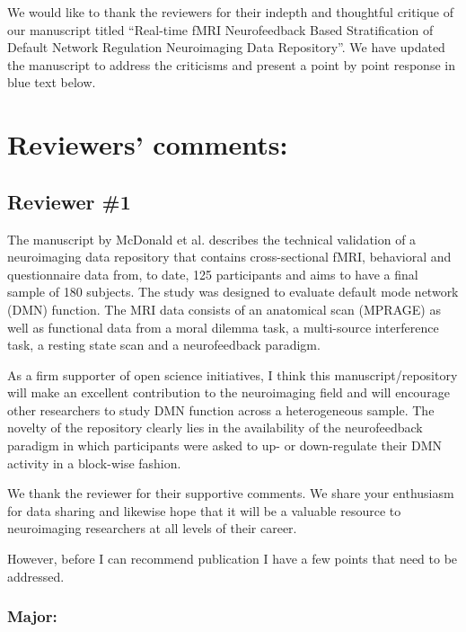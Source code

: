 \documentclass{article}
\newcommand{\RESPONSE}[1]{\textcolor{responseblue}{#1}}
\begin{document}
\sffamily

We would like to thank the reviewers for their indepth and thoughtful critique of our manuscript titled ``Real-time fMRI Neurofeedback Based Stratification of Default Network Regulation Neuroimaging Data Repository''. We have updated the manuscript to address the criticisms and present a point by point response in \RESPONSE{blue text} below.

\section*{Reviewers' comments:}

\subsection*{Reviewer \#1} 

The manuscript by McDonald et al. describes the technical validation of a neuroimaging data repository that contains cross-sectional fMRI, behavioral and questionnaire data from, to date, 125 participants and aims to have a final sample of 180 subjects. The study was designed to evaluate default mode network (DMN) function. The MRI data consists of an anatomical scan (MPRAGE) as well as functional data from a moral dilemma task, a multi-source interference task, a resting state scan and a neurofeedback paradigm.

As a firm supporter of open science initiatives, I think this manuscript/repository will make an excellent contribution to the neuroimaging field and will encourage other researchers to study DMN function across a heterogeneous sample. The novelty of the repository clearly lies in the availability of the neurofeedback paradigm in which participants were asked to up- or down-regulate their DMN activity in a block-wise fashion.

\RESPONSE{We thank the reviewer for their supportive comments. We share your enthusiasm for data sharing and likewise hope that it will be a valuable resource to neuroimaging researchers at all levels of their career.}

However, before I can recommend publication I have a few points that need to be addressed.

\subsubsection*{Major:}
\end{document}
